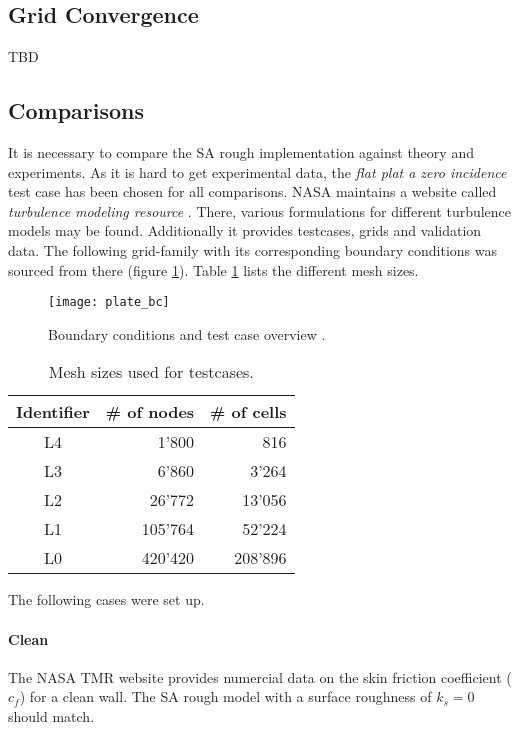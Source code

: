\subsection{Grid Convergence}

TBD

\subsection{Comparisons}
It is necessary to compare the SA rough implementation against theory and
experiments. As it is hard to get experimental data, the \textit{flat plat a
zero incidence} test case has been chosen for all comparisons. NASA maintains a
website called \textit{turbulence modeling resource} \cite{rumsey_flat}. There,
various formulations for different turbulence models may be found. Additionally
it provides testcases, grids and validation data. The following grid-family with
its corresponding boundary conditions was sourced from there (figure
\ref{fig:plate_bc}). Table \ref{tab:plate_sizes} lists the different mesh sizes.

\begin{figure}[H] \centering
\texttt{[image: plate\_bc]}
    \caption{Boundary conditions and test case overview \cite{rumsey_flat}.}
    \label{fig:plate_bc}
\end{figure}

\begin{table}[H]
  \centering
  \begin{tabular}{c r r}
    Identifier      & \# of nodes   & \# of cells \\
    \toprule
    L4              & 1'800         & 816 \\
    L3              & 6'860         & 3'264 \\
    L2              & 26'772        & 13'056 \\
    L1              & 105'764       & 52'224 \\
    L0              & 420'420       & 208'896 \\

  \end{tabular}
  \caption{Mesh sizes used for testcases.}
  \label{tab:plate_sizes}
\end{table}

\noindent The following cases were set up.

\paragraph{Clean}
The NASA TMR website \cite{rumsey_flat} provides numercial data on the skin
friction coefficient ($c_{f}$) for a clean wall. The SA rough model with a
surface roughness of $k_{s} = 0$ should match.

